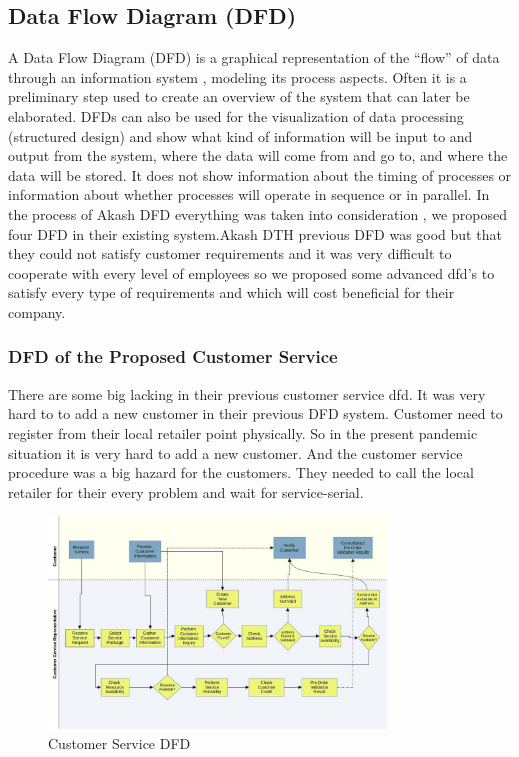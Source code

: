 \begin{spacing}{1}
\subsection{Data Flow Diagram (DFD)}
A Data Flow Diagram (DFD) is a graphical representation of the “flow” of data through an information system , modeling its process aspects. Often it is a preliminary step used to create an overview of the system that can later be elaborated. DFDs can also be used for the visualization of data processing (structured design) and show what kind of information will be input to and output from the system, where the data will come from and go to, and where the data will be stored. It does not show information about the timing of processes or information about whether processes will operate in sequence or in parallel. In the process of Akash DFD everything was taken into consideration , we proposed four DFD in their existing system.Akash DTH previous  DFD was good but that they could not satisfy customer requirements and it was very difficult to cooperate with every level of employees so we proposed  some advanced dfd’s to satisfy every type of requirements and which will cost beneficial for their company.

\subsubsection{DFD of the Proposed Customer Service }
There are some big lacking in their previous customer service dfd. It was very hard to to add a new customer in their previous DFD system. Customer need to register from their local retailer point physically. So in the present pandemic situation it is very hard to add a new customer. And the customer service procedure was a big hazard for the customers. They needed to call the local retailer for their every problem and wait for service-serial. 

\begin{figure}[H]
	\centering
	\includegraphics[width=0.8\textwidth]{flow22}
	\caption{Customer Service DFD}
	\label{fig:dfdproposed1}
\end{figure}


\end{spacing}

